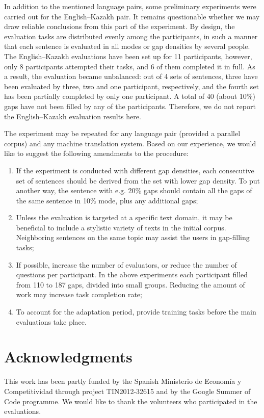 \documentclass[11pt]{article}
\begin{document}
In addition to the mentioned language pairs, some preliminary experiments were carried out for the English--Kazakh pair. It remains questionable whether we may draw reliable conclusions from this part of the experiment. By design, the evaluation tasks are distributed evenly among the participants, in such a manner that each sentence is evaluated in all modes or gap densities by several people. The English--Kazakh evaluations have been set up for 11 participants, however, only 8 participants attempted their tasks, and 6 of them completed it in full. As a result, the evaluation became unbalanced: out of 4 sets of sentences, three have been evaluated by three, two and one participant, respectively, and the fourth set has been partially completed by only one participant. A total of 40 (about 10\%) gaps have not been filled by any of the participants. Therefore, we do not report the English--Kazakh evaluation results here.

The experiment may be repeated for any language pair (provided a parallel corpus) and
any machine translation system. Based on our experience, we would like to suggest the following amendments to the procedure:
\begin{enumerate}
\item If the experiment is conducted with different gap densities, each consecutive set of sentences should be derived from the set with lower gap density. To put another way, the sentence with e.g. 20\% gaps should contain all the gaps of the same sentence in 10\% mode, plus any additional gaps;
\item Unless the evaluation is targeted at a specific text domain, it may be beneficial to include a stylistic variety of texts in the initial corpus. Neighboring sentences on the same topic may assist the users in gap-filling tasks;
\item If possible, increase the number of evaluators, or reduce the number of questions per participant. In the above experiments each participant filled from 110 to 187 gaps, divided into small groups. Reducing the amount of work may increase task completion rate;
\item To account for the adaptation period, provide training tasks before the main evaluations take place.
\end{enumerate}

\section{Acknowledgments}

This work has been partly funded by the Spanish Ministerio de Econom{\'i}a y Competitividad through project TIN2012-32615 and by the Google Summer of Code programme. We would like to thank the volunteers who participated in the evaluations.




\end{document}
